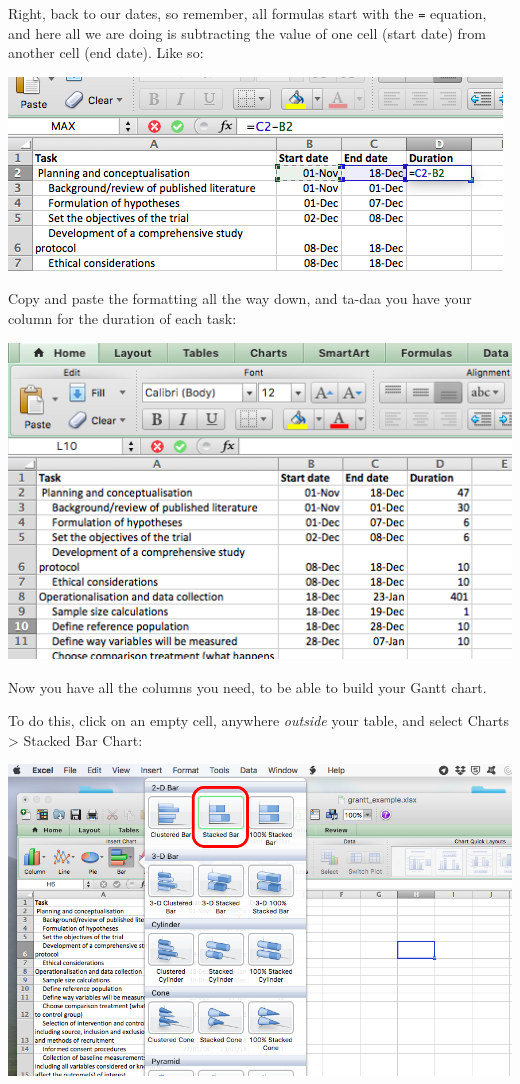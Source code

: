 \documentclass[
]{book}
\begin{document}
Right, back to our dates, so remember, all formulas start with the \texttt{=} equation, and here all we are doing is subtracting the value of one cell (start date) from another cell (end date). Like so:

\includegraphics{imgs/calc_dur.png}

Copy and paste the formatting all the way down, and ta-daa you have your column for the duration of each task:

\includegraphics{imgs/all_cols_gantt.png}

Now you have all the columns you need, to be able to build your Gantt chart.

To do this, click on an empty cell, anywhere \emph{outside} your table, and select Charts \textgreater{} Stacked Bar Chart:

\includegraphics{imgs/gantt_select_bar.png}
\end{document}
